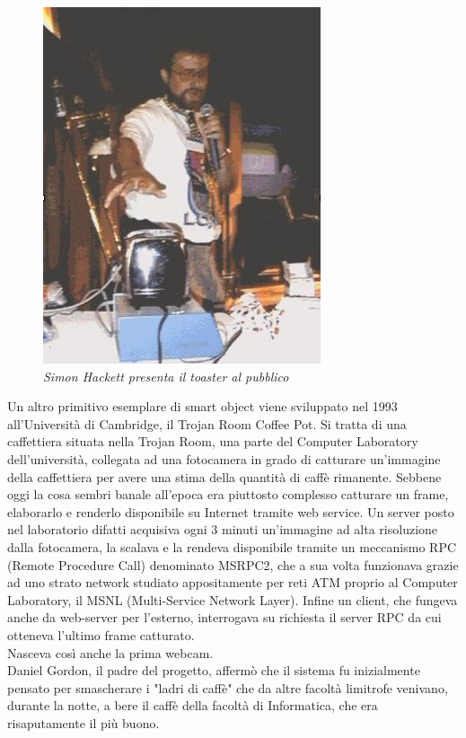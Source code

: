 \begin{figure}[H]
\centering
\includegraphics[scale=0.60]{immagini/toaster.jpg}
\caption{\textit{Simon Hackett presenta il toaster al pubblico}}
\end{figure}
\vspace{1.0cm}
Un altro primitivo esemplare di smart object viene sviluppato nel 1993 all'Università di Cambridge, il Trojan Room Coffee Pot. Si tratta di una caffettiera situata nella Trojan Room, una parte del Computer Laboratory dell'università, collegata ad una fotocamera in grado di catturare un'immagine della caffettiera per avere una stima della quantità di caffè rimanente. Sebbene oggi la cosa sembri banale all'epoca era piuttosto complesso catturare un frame, elaborarlo e renderlo disponibile su Internet tramite web service. Un server posto nel laboratorio difatti acquisiva ogni 3 minuti un'immagine ad alta risoluzione dalla fotocamera, la scalava e la rendeva disponibile tramite un meccanismo RPC (Remote Procedure Call) denominato MSRPC2, che a sua volta funzionava grazie ad uno strato network studiato appositamente per reti ATM proprio al Computer Laboratory, il MSNL (Multi-Service Network Layer). Infine un client, che fungeva anche da web-server per l'esterno, interrogava su richiesta il server RPC da cui otteneva l'ultimo frame catturato.
\\Nasceva così anche la prima webcam.
\\Daniel Gordon, il padre del progetto, affermò che il sistema fu inizialmente pensato per smascherare i "ladri di caffè" che da altre facoltà limitrofe venivano, durante la notte, a bere il caffè della facoltà di Informatica, che era risaputamente il più buono.
